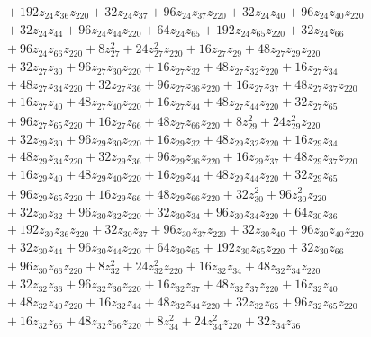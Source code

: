 \begin{align*}
&\quad{}+192z_{24} z_{36} z_{220}+32z_{24} z_{37}+96z_{24} z_{37} z_{220}+32z_{24} z_{40}+96z_{24} z_{40} z_{220}\\
&\quad{}+32z_{24} z_{44}+96z_{24} z_{44} z_{220}+64z_{24} z_{65}+192z_{24} z_{65} z_{220}+32z_{24} z_{66}\\
&\quad{}+96z_{24} z_{66} z_{220}+8z_{27}^{2}+24z_{27}^{2} z_{220}+16z_{27} z_{29}+48z_{27} z_{29} z_{220}\\
&\quad{}+32z_{27} z_{30}+96z_{27} z_{30} z_{220}+16z_{27} z_{32}+48z_{27} z_{32} z_{220}+16z_{27} z_{34}\\
&\quad{}+48z_{27} z_{34} z_{220}+32z_{27} z_{36}+96z_{27} z_{36} z_{220}+16z_{27} z_{37}+48z_{27} z_{37} z_{220}\\
&\quad{}+16z_{27} z_{40}+48z_{27} z_{40} z_{220}+16z_{27} z_{44}+48z_{27} z_{44} z_{220}+32z_{27} z_{65}\\
&\quad{}+96z_{27} z_{65} z_{220}+16z_{27} z_{66}+48z_{27} z_{66} z_{220}+8z_{29}^{2}+24z_{29}^{2} z_{220}\\
&\quad{}+32z_{29} z_{30}+96z_{29} z_{30} z_{220}+16z_{29} z_{32}+48z_{29} z_{32} z_{220}+16z_{29} z_{34}\\
&\quad{}+48z_{29} z_{34} z_{220}+32z_{29} z_{36}+96z_{29} z_{36} z_{220}+16z_{29} z_{37}+48z_{29} z_{37} z_{220}\\
&\quad{}+16z_{29} z_{40}+48z_{29} z_{40} z_{220}+16z_{29} z_{44}+48z_{29} z_{44} z_{220}+32z_{29} z_{65}\\
&\quad{}+96z_{29} z_{65} z_{220}+16z_{29} z_{66}+48z_{29} z_{66} z_{220}+32z_{30}^{2}+96z_{30}^{2} z_{220}\\
&\quad{}+32z_{30} z_{32}+96z_{30} z_{32} z_{220}+32z_{30} z_{34}+96z_{30} z_{34} z_{220}+64z_{30} z_{36}\\
&\quad{}+192z_{30} z_{36} z_{220}+32z_{30} z_{37}+96z_{30} z_{37} z_{220}+32z_{30} z_{40}+96z_{30} z_{40} z_{220}\\
&\quad{}+32z_{30} z_{44}+96z_{30} z_{44} z_{220}+64z_{30} z_{65}+192z_{30} z_{65} z_{220}+32z_{30} z_{66}\\
&\quad{}+96z_{30} z_{66} z_{220}+8z_{32}^{2}+24z_{32}^{2} z_{220}+16z_{32} z_{34}+48z_{32} z_{34} z_{220}\\
&\quad{}+32z_{32} z_{36}+96z_{32} z_{36} z_{220}+16z_{32} z_{37}+48z_{32} z_{37} z_{220}+16z_{32} z_{40}\\
&\quad{}+48z_{32} z_{40} z_{220}+16z_{32} z_{44}+48z_{32} z_{44} z_{220}+32z_{32} z_{65}+96z_{32} z_{65} z_{220}\\
&\quad{}+16z_{32} z_{66}+48z_{32} z_{66} z_{220}+8z_{34}^{2}+24z_{34}^{2} z_{220}+32z_{34} z_{36}\\

\end{align*}
